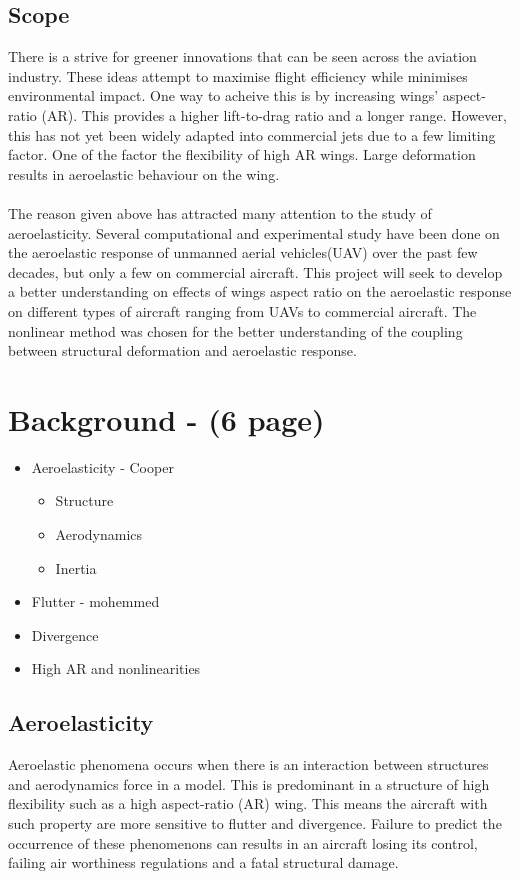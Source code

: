 \documentclass[11pt]{article}
\begin{document}
\subsection{Scope} 
There is a strive for greener innovations that can be seen across the aviation industry. These ideas attempt to maximise flight efficiency while minimises environmental impact. One way to acheive this is by increasing wings' aspect-ratio (AR). This provides a higher lift-to-drag ratio and a longer range. However, this has not yet been widely adapted into commercial jets due to a few limiting factor. One of the factor the flexibility of high AR wings. Large deformation results in aeroelastic behaviour on the wing.\\ \\
The reason given above has attracted many attention to the study of aeroelasticity. Several computational and experimental study have been done on the aeroelastic response of unmanned aerial vehicles(UAV) over the past few decades, but only a few on commercial aircraft. This project will seek to develop a better understanding on effects of wings aspect ratio on the aeroelastic response on different types of aircraft ranging from UAVs to commercial aircraft. The nonlinear method was chosen for the better understanding of the coupling between structural deformation and aeroelastic response. 

\newpage
\section{Background - (6 page)}
\begin{itemize}
    \item Aeroelasticity - Cooper
    \begin{itemize}
        \item Structure
        \item Aerodynamics
        \item Inertia
    \end{itemize}
    \item Flutter - mohemmed
    \item Divergence
    \item High AR and nonlinearities
\end{itemize}
\subsection{Aeroelasticity}
Aeroelastic phenomena occurs when there is an interaction between structures and aerodynamics force in a model. This is predominant in a structure of high flexibility such as a high aspect-ratio (AR) wing. This means the aircraft with such property are more sensitive to flutter and divergence. Failure to predict the occurrence of these phenomenons can results in an aircraft losing its control, failing air worthiness regulations and a fatal structural damage.\\
\end{document}
